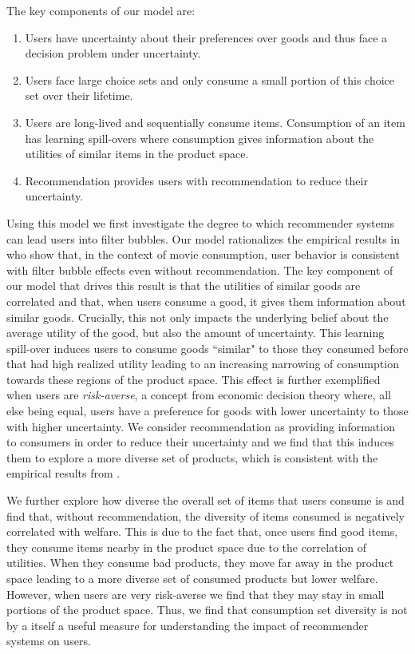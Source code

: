 \documentclass[sigconf]{acmart}
\begin{document}
The key components of our model are:
\begin{enumerate}
\item Users have uncertainty about their preferences over goods and thus face a decision problem under uncertainty.
\item Users face large choice sets and only consume a small portion of this choice set over their lifetime.
\item Users are long-lived and sequentially consume items. Consumption of an item has learning spill-overs where consumption gives information about the utilities of similar items in the product space.
\item Recommendation provides users with recommendation to reduce their uncertainty.
\end{enumerate}
Using this model we first investigate the degree to which recommender systems can lead users into filter bubbles. Our model rationalizes the empirical results in \cite{nguyen2014exploring} who show that, in the context of movie consumption, user behavior is consistent with filter bubble effects even without recommendation. The key component of our model that drives this result is that the utilities of similar goods are correlated and that, when users consume a good, it gives them information about similar goods. Crucially, this not only impacts the underlying belief about the average utility of the good, but also the amount of uncertainty. This learning spill-over induces users to consume goods ``similar" to those they consumed before that had high realized utility leading to an increasing narrowing of consumption towards these regions of the product space. This effect is further exemplified when users are \textit{risk-averse}, a concept from economic decision theory where, all else being equal, users have a preference for goods with lower uncertainty to those with higher uncertainty. We consider recommendation as providing information to consumers in order to reduce their uncertainty and we find that this induces them to explore a more diverse set of products, which is consistent with the empirical results from \cite{nguyen2014exploring}.

We further explore how diverse the overall set of items that users consume is and find that, without recommendation, the diversity of items consumed is negatively correlated with welfare. This is due to the fact that, once users find good items, they consume items nearby in the product space due to the correlation of utilities. When they consume bad products, they move far away in the product space leading to a more diverse set of consumed products but lower welfare. However, when users are very risk-averse we find that they may stay in small portions of the product space. Thus, we find that consumption set diversity is not by a itself a useful measure for understanding the impact of recommender systems on users.
\end{document}
